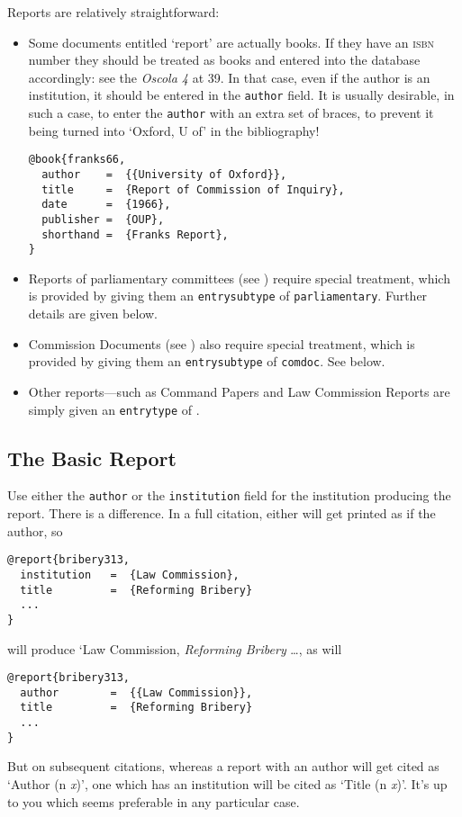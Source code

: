 \documentclass[a5paper,fontsize=9pt,DIV=1]{scrartcl}
\newcounter{egcounter}\setcounter{egcounter}{0}
\newenvironment{bibexample}[1][]{%
  \medskip\par\small\noindent\ignorespaces
  \marginpar{[\refstepcounter{egcounter}\arabic{egcounter}]\label{#1}}
  \begin{minipage}[t]{0.95\linewidth}}
 {\end{minipage}\par\medskip}
\begin{document}
Reports are relatively straightforward:
\begin{itemize}
\item Some documents entitled `report' are actually books. If they
  have an \textsc{isbn} number they should be treated as books and
  entered into the database accordingly: see the \emph{Oscola 4} at
  39. In that case, even if the author is an institution, it should be
  entered in the \texttt{author} field. It is usually desirable, in
  such a case, to enter the \texttt{author} with an extra set of
  braces, to prevent it being turned into `Oxford, U of' in the bibliography!
\begin{bibexample}[franks66]
\begin{verbatim}
@book{franks66,
  author    =  {{University of Oxford}},
  title     =  {Report of Commission of Inquiry},
  date      =  {1966},
  publisher =  {OUP},
  shorthand =  {Franks Report},
}
\end{verbatim}
\end{bibexample}
\item Reports of parliamentary committees (see \cite[40]{oscola})
  require special treatment, which is provided by giving them an
  \texttt{entrysubtype} of \texttt{parliamentary}. Further details are
  given below.
\item Commission Documents (see \cite[41]{oscola}) also require
special treatment, which is provided by giving them an
\texttt{entrysubtype} of \texttt{comdoc}. See below.
\item Other reports---such as Command Papers and Law Commission
  Reports are simply given an \texttt{entrytype} of \texttt{\@report}. 
\end{itemize}

\subsection{The Basic Report}

Use either the \texttt{author} or the \texttt{institution} field for
the institution producing the report. There is a difference. In a full
citation, either will get printed as if the author, so
\begin{verbatim}
@report{bribery313,
  institution   =  {Law Commission},
  title         =  {Reforming Bribery}
  ...
}
\end{verbatim}
will produce `Law Commission, \emph{Reforming Bribery} \ldots, as will
\begin{verbatim}
@report{bribery313,
  author        =  {{Law Commission}},
  title         =  {Reforming Bribery}
  ...
}
\end{verbatim}
But on subsequent citations, whereas a report with an author will get
cited as `Author (n \emph{x})', one which has an institution will be
cited as `Title (n \emph{x})'. It's up to you which seems preferable
in any particular case.
\end{document}
